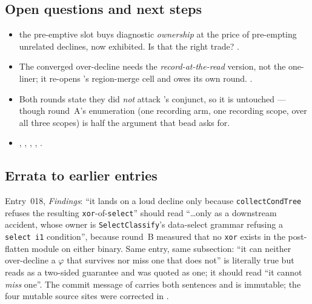 \subsection*{Open questions and next steps}
\begin{itemize}
  \item {} the pre-emptive slot buys diagnostic \emph{ownership} at
        the price of pre-empting unrelated declines, now exhibited. Is that the right trade?
        .
  \item The converged over-decline needs the \emph{record-at-the-read} version, not the
        one-liner; it re-opens 's region-merge cell and owes its
        own round. .
  \item Both rounds state they did \emph{not} attack 's conjunct,
        so it is untouched --- though round~A's enumeration (one recording arm, one recording
        scope, over all three scopes) is half the argument that bead asks for.
  \item {}, ,
        , ,
        .
\end{itemize}

\subsection*{Errata to earlier entries}
Entry~018, \emph{Findings}: ``it lands on a loud decline only because \texttt{collectCondTree}
refuses the resulting \texttt{xor}-of-\texttt{select}'' should read ``\dots only as a downstream
accident, whose owner is \texttt{SelectClassify}'s data-select grammar refusing a
\texttt{select i1} condition'', because round~B measured that no \texttt{xor} exists in the
post-flatten module on either binary. Same entry, same subsection: ``it can neither
over-decline a \(\varphi\) that survives nor miss one that does not'' is literally true but
reads as a two-sided guarantee and was quoted as one; it should read ``it cannot \emph{miss}
one''. The commit message of  carries both sentences and is immutable; the
four mutable source sites were corrected in .
